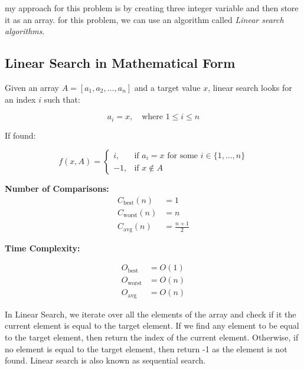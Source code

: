 \documentclass{article}
\begin{document}
  my approach for this problem is by creating three integer variable and then store it as an array. for this problem, we can use 
  an algorithm called \textit{Linear search algorithms}. 

  \subsection{Linear Search in Mathematical Form}

  Given an array $A = [a_1, a_2, \dots, a_n]$ and a target value $x$, linear search looks for an index $i$ such that:
  
  \[
  a_i = x, \quad \text{where } 1 \leq i \leq n
  \]
  
  If found:
  
  \[
  f(x, A) =
  \begin{cases}
  i, & \text{if } a_i = x \text{ for some } i \in \{1, \dots, n\} \\
  -1, & \text{if } x \notin A
  \end{cases}
  \]
  
  \textbf{Number of Comparisons:}
  \[
  \begin{aligned}
  C_{\text{best}}(n) &= 1 \\
  C_{\text{worst}}(n) &= n \\
  C_{\text{avg}}(n) &= \frac{n + 1}{2}
  \end{aligned}
  \]
  
  \textbf{Time Complexity:}
  
  \[
  \begin{aligned}
  O_{\text{best}} &= O(1) \\
  O_{\text{worst}} &= O(n) \\
  O_{\text{avg}} &= O(n)
  \end{aligned}
  \]

  In Linear Search, we iterate over all the elements of the array and check if it the current element is equal to the target element. If we find any element to be equal to the target element, then return the index of the current element. Otherwise, if no element is equal to the target element, then return -1 as the element is not found. Linear search is also known as sequential search.
  
\end{document}

